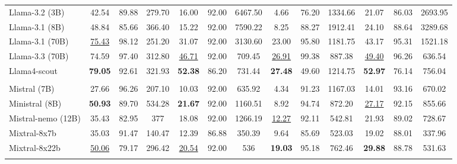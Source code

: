 \begin{table}
\begin{adjustbox}{width=\textwidth}
\begin{tabulary}{1.3\textwidth}{LCCCCCCCCCCCC}
Llama-3.2 (3B) & 42.54 & 89.88 & 279.70 & 16.00 & 92.00 & 6467.50 & 4.66 & 76.20 & 1334.66 &  21.07 &  86.03 &  2693.95 \\
Llama-3.1 (8B) & 48.84 & 85.66 & 366.40 & 15.22 & 92.00 & 7590.22 & 8.25 & 88.27 & 1912.41 &  24.10 &  88.64 &  3289.68 \\
Llama-3.1 (70B) & \underline{75.43} & 98.12 & 251.20 & 31.07 & 92.00 & 3130.60 & 23.00 & 95.80 & 1181.75 &  43.17 &  95.31 &  1521.18 \\
Llama-3.3 (70B) & 74.59 & 97.40 & 312.80 & \underline{46.71} & 92.00 & 709.45 & \underline{26.91} & 99.38 & 887.38 &  \underline{49.40} &  96.26 &  636.54 \\
Llama4-scout & \textbf{79.05} & 92.61 & 321.93 & \textbf{52.38} & 86.20 & 731.44 & \textbf{27.48} & 49.60 & 1214.75 &  \textbf{52.97} &  76.14 &  756.04 \\
\midrule
{}
 \\
\midrule
Mistral (7B) & 27.66 & 96.26 & 207.10 & 10.03 & 92.00 & 635.92 & 4.34 & 91.23 & 1167.03 &  14.01 &  93.16 &  670.02 \\
Ministral (8B) & \textbf{50.93} & 89.70 & 534.28 & \textbf{21.67} & 92.00 & 1160.51 & 8.92 & 94.74 & 872.20 &  \underline{27.17} &  92.15 &  855.66 \\
Mistral-nemo (12B) & 35.43 & 82.95 & 377 & 18.08 & 92.00 & 1266.19 & \underline{12.27} & 92.11 & 542.81 &  21.93 &  89.02 &  728.67 \\
Mixtral-8x7b & 35.03 & 91.47 & 140.47 & 12.39 & 86.88 & 350.39 & 9.64 & 85.69 & 523.03 &  19.02 &  88.01 &  337.96 \\
Mixtral-8x22b & \underline{50.06} & 79.17 & 296.42 & \underline{20.54} & 92.00 & 536 & \textbf{19.03} & 95.18 & 762.46 &  \textbf{29.88} &  88.78 &  531.63 \\
\midrule
{}

\end{tabulary}
\end{adjustbox}
\end{table}
